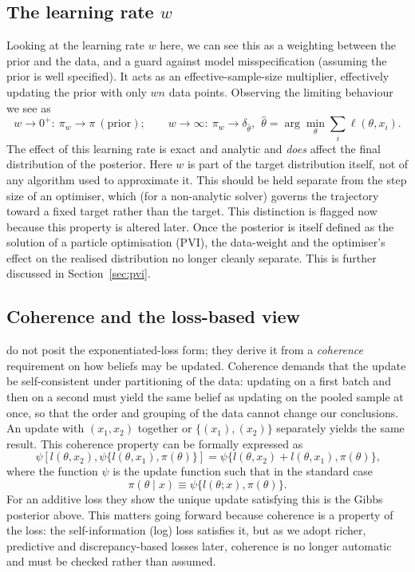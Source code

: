 \documentclass[mstat,12pt]{unswthesis}
\begin{document}
\subsection*{The learning rate $w$}
Looking at the learning rate $w$ here, we can see this as a weighting between the prior and the data, and a guard against model misspecification (assuming the prior is well specified). It acts as an effective-sample-size multiplier, effectively updating the prior with only $wn$ data points. Observing the limiting behaviour we see as
$$
    w \to 0^+ : \ \pi_w \to \pi \ (\text{prior}); \qquad
    w \to \infty : \ \pi_w \to \delta_{\hat{\theta}},\ \ \hat{\theta} = \arg\min_{\theta}\textstyle\sum_i \ell(\theta, x_i).
$$
The effect of this learning rate is exact and analytic and \emph{does} affect the final distribution of the posterior.
Here $w$ is part of the target distribution itself, not of any algorithm used to approximate it. This should be held separate from the step size of an optimiser, which (for a non-analytic solver) governs the trajectory toward a fixed target rather than the target. This distinction is flagged now because this property is altered later. Once the posterior is itself defined as the solution of a particle optimisation (PVI), the data-weight and the optimiser's effect on the realised distribution no longer cleanly separate. This is further discussed in Section~\ref{sec:pvi}.
\vspace{1.5em}
\subsection*{Coherence and the loss-based view}
\citet{bissiri2016general} do not posit the exponentiated-loss form; they derive it from a \emph{coherence} requirement on how beliefs may be updated. Coherence demands that the update be self-consistent under partitioning of the data: updating on a first batch and then on a second must yield the same belief as updating on the pooled sample at once, so that the order and grouping of the data cannot change our conclusions. An update with $(x_1, x_2)$ together or $\{(x_1), (x_2)\}$ separately yields the same result. This coherence property can be formally expressed as
$$
    \psi[l(\theta, x_2), \psi\{l(\theta, x_1),\pi(\theta)\}] = \psi\{l(\theta, x_2) + l(\theta, x_1), \pi(\theta)\}\text{,}
$$
where the function $\psi$ is the update function such that in the standard case
\[
    \pi(\theta \mid x) \equiv \psi \{l(\theta; x), \pi(\theta)\}.
\]
For an additive loss they show the unique update satisfying this is the Gibbs posterior above. This matters going forward because coherence is a property of the loss: the self-information (log) loss satisfies it, but as we adopt richer, predictive and discrepancy-based losses later, coherence is no longer automatic and must be checked rather than assumed.
\end{document}

